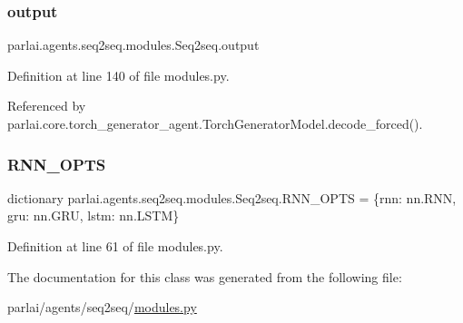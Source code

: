 \mbox{\label{classparlai_1_1agents_1_1seq2seq_1_1modules_1_1Seq2seq_abccc59e50a65fe8e1b7ca9d3d29fd070}} 
\subsubsection{\texorpdfstring{output}{output}}
{\footnotesize\ttfamily parlai.\+agents.\+seq2seq.\+modules.\+Seq2seq.\+output}



Definition at line 140 of file modules.\+py.



Referenced by parlai.\+core.\+torch\+\_\+generator\+\_\+agent.\+Torch\+Generator\+Model.\+decode\+\_\+forced().

\mbox{\label{classparlai_1_1agents_1_1seq2seq_1_1modules_1_1Seq2seq_a3962ff3f0654a2808f13d677c7192fa2}} 
\subsubsection{\texorpdfstring{R\+N\+N\+\_\+\+O\+P\+TS}{RNN\_OPTS}}
{\footnotesize\ttfamily dictionary parlai.\+agents.\+seq2seq.\+modules.\+Seq2seq.\+R\+N\+N\+\_\+\+O\+P\+TS = \{\textquotesingle{}rnn\textquotesingle{}\+: nn.\+R\+NN, \textquotesingle{}gru\textquotesingle{}\+: nn.\+G\+RU, \textquotesingle{}lstm\textquotesingle{}\+: nn.\+L\+S\+TM\}\hspace{0.3cm}{\ttfamily [static]}}



Definition at line 61 of file modules.\+py.



The documentation for this class was generated from the following file\+:\begin{DoxyCompactItemize}
\item 
parlai/agents/seq2seq/\hyperlink{parlai_2agents_2seq2seq_2modules_8py}{modules.\+py}\end{DoxyCompactItemize}
